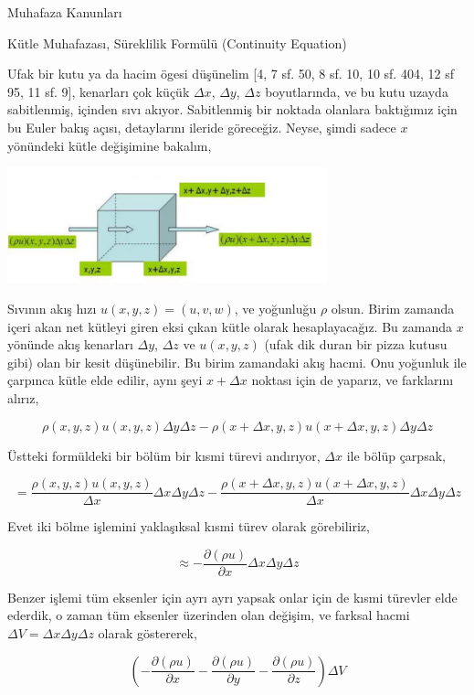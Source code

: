 \documentclass[12pt,fleqn]{article}\usepackage{../../common}
\begin{document}
Muhafaza Kanunları

Kütle Muhafazası, Süreklilik Formülü (Continuity Equation)

Ufak bir kutu ya da hacim ögesi düşünelim [4, 7 sf. 50, 8 sf. 10, 10 sf. 404, 12
  sf 95, 11 sf. 9], kenarları çok küçük $\Delta x$, $\Delta y$, $\Delta z$
boyutlarında, ve bu kutu uzayda sabitlenmiş, içinden sıvı akıyor. Sabitlenmiş
bir noktada olanlara baktığımız için bu Euler bakış açısı, detaylarını ileride
göreceğiz. Neyse, şimdi sadece $x$ yönündeki kütle değişimine bakalım,

\includegraphics[width=25em]{phy_050_cons_03.png}

Sıvının akış hızı $u(x,y,z) = (u,v,w)$, ve yoğunluğu $\rho$ olsun. Birim zamanda
içeri akan net kütleyi giren eksi çıkan kütle olarak hesaplayacağız. Bu zamanda
$x$ yönünde akış kenarları $\Delta y$, $\Delta z$ ve $u(x,y,z)$ (ufak dik duran
bir pizza kutusu gibi) olan bir kesit düşünebilir. Bu birim zamandaki akış
hacmi.  Onu yoğunluk ile çarpınca kütle elde edilir, aynı şeyi $x + \Delta x$
noktası için de yaparız, ve farklarını alırız,

$$
\rho(x,y,z)u(x,y,z)\Delta y \Delta z -
\rho(x+\Delta x,y,z) u(x+\Delta x,y,z)\Delta y \Delta z
$$

Üstteki formüldeki bir bölüm bir kısmi türevi andırıyor, $\Delta x$ ile bölüp
çarpsak,

$$
= \frac{\rho(x,y,z)u(x,y,z)}{\Delta x}\Delta x \Delta y \Delta z -
\frac{\rho(x+\Delta x,y,z) u(x+\Delta x,y,z)}{\Delta x} \Delta x \Delta y \Delta z
$$

Evet iki bölme işlemini yaklaşıksal kısmi türev olarak görebiliriz,

$$
\approx -\frac{\partial (\rho u) }{\partial x} \Delta x \Delta y \Delta z
$$

Benzer işlemi tüm eksenler için ayrı ayrı yapsak onlar için de kısmi türevler
elde ederdik, o zaman tüm eksenler üzerinden olan değişim, ve farksal hacmi
$\Delta V = \Delta x \Delta y \Delta z$ olarak göstererek,

$$
\left(
-\frac{\partial (\rho u) }{\partial x} 
-\frac{\partial (\rho u) }{\partial y} 
-\frac{\partial (\rho u) }{\partial z} 
\right) \Delta V
$$
\end{document}
